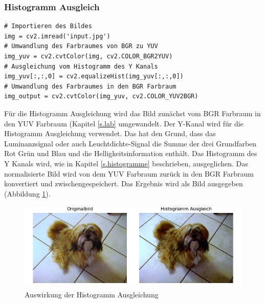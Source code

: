 \subsubsection{Histogramm Ausgleich}
\begin{lstlisting}
# Importieren des Bildes
img = cv2.imread('input.jpg')
# Umwandlung des Farbraumes von BGR zu YUV
img_yuv = cv2.cvtColor(img, cv2.COLOR_BGR2YUV)
# Ausgleichung vom Histogramm des Y Kanals
img_yuv[:,:,0] = cv2.equalizeHist(img_yuv[:,:,0])
# Umwandlung des Farbraumes in den BGR Farbraum
img_output = cv2.cvtColor(img_yuv, cv2.COLOR_YUV2BGR)
\end{lstlisting}
Für die Histogramm Ausgleichung \cite{histogram2012equalisation} wird das Bild zunächst vom BGR Farbraum in den YUV Farbraum (Kapitel \ref{s.lab} umgewandelt. Der Y-Kanal wird für die Histogramm Ausgleichung verwendet. Das hat den Grund, dass das Luminanzsignal oder auch Leuchtdichte-Signal die Summe der drei Grundfarben Rot Grün und Blau und die Helligkeitsinformation enthält. Das Histogramm des Y Kanals wird, wie in Kapitel \ref{s.histogramme} beschrieben, ausgeglichen. Das normalisierte Bild wird von dem YUV Farbraum zurück in den BGR Farbraum konvertiert und zwischengespeichert. Das Ergebnis wird als Bild ausgegeben (Abbildung \ref{img:histogrameq}).
\begin{figure}
	[h]
	\centering
	\includegraphics[scale=0.7]{Sources/histeq.jpg}
	\caption{Auswirkung der Histogramm Ausgleichung}
	\label{img:histogrameq}
\end{figure}	
